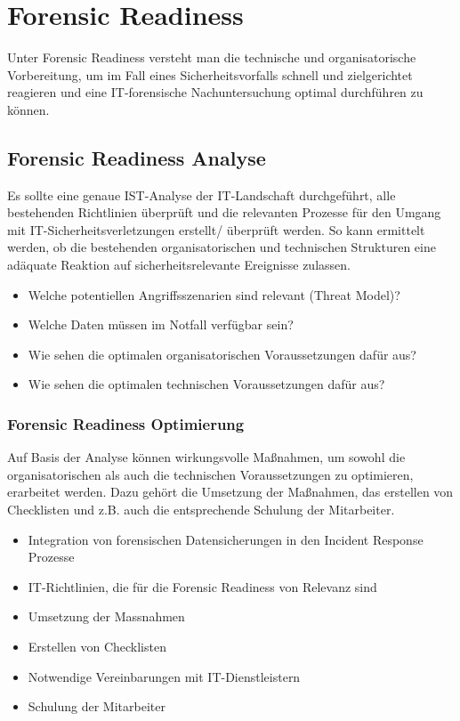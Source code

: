 


\section{Forensic Readiness}
Unter Forensic Readiness versteht man die technische und organisatorische Vorbereitung, um im Fall eines Sicherheitsvorfalls schnell und zielgerichtet reagieren und eine IT-forensische Nachuntersuchung optimal durchführen zu können.

\subsection{Forensic Readiness Analyse}
Es sollte eine genaue IST-Analyse der IT-Landschaft durchgeführt, alle bestehenden Richtlinien überprüft und die relevanten Prozesse für den Umgang mit IT-Sicherheitsverletzungen erstellt/ überprüft werden. So kann ermittelt werden, ob die bestehenden organisatorischen und technischen Strukturen eine adäquate Reaktion auf sicherheitsrelevante Ereignisse zulassen.\\

\begin{itemize}
    \item Welche potentiellen Angriffsszenarien sind relevant (Threat Model)?
    \item Welche Daten müssen im Notfall verfügbar sein?
    \item Wie sehen die optimalen organisatorischen Voraussetzungen dafür aus?
    \item Wie sehen die optimalen technischen Voraussetzungen dafür aus?
\end{itemize}

\subsubsection{Forensic Readiness Optimierung}
Auf Basis der Analyse können wirkungsvolle Maßnahmen, um sowohl die organisatorischen als auch die technischen Voraussetzungen zu optimieren, erarbeitet werden. Dazu gehört die Umsetzung der Maßnahmen, das erstellen von Checklisten und z.B. auch die entsprechende Schulung der Mitarbeiter.\\

\begin{itemize}
    \item Integration von forensischen Datensicherungen in den Incident Response Prozesse
    \item IT-Richtlinien, die für die Forensic Readiness von Relevanz sind
    \item Umsetzung der Massnahmen
    \item Erstellen von Checklisten
    \item Notwendige Vereinbarungen mit IT-Dienstleistern
    \item Schulung der Mitarbeiter
\end{itemize}

